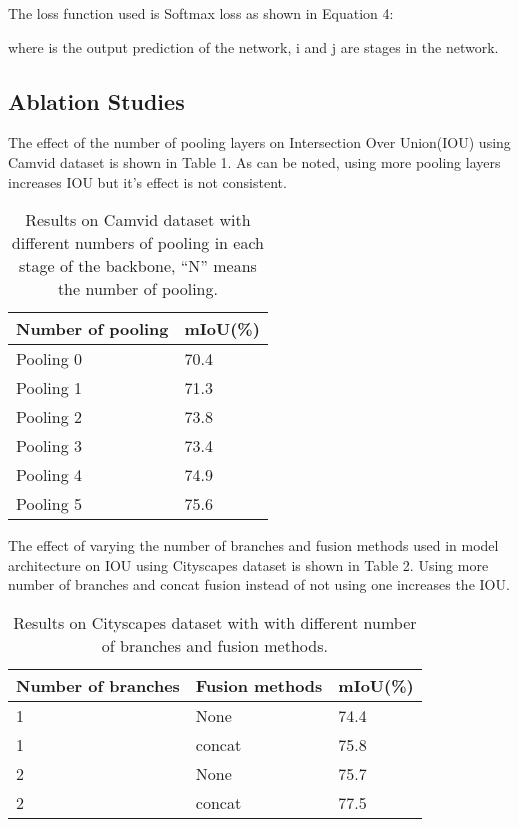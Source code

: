\documentclass{article}
\begin{document}
The loss function used is Softmax loss as shown in Equation 4:



where  is the output prediction of the network, i and j are stages in the network.

\subsection{Ablation Studies}

The effect of the number of pooling layers on Intersection Over Union(IOU) using Camvid dataset is shown in Table 1. As can be noted, using more pooling layers increases IOU but it's effect is not consistent.

\begin{table}[h]
  \caption{Results on Camvid dataset with different numbers of pooling in each stage of the backbone, “N” means the number of pooling.}
  \label{sample-table2}
  \centering
  \begin{tabular}{ll}
  \toprule
    Number of pooling &mIoU(\%)\\
   \midrule
 Pooling 0 &70.4\\
Pooling 1 &71.3\\
Pooling 2 &73.8\\
Pooling 3 &73.4\\
Pooling 4 &74.9\\
Pooling 5 &75.6\\
    \bottomrule
  \end{tabular}
\end{table}

The effect of varying the number of branches and fusion methods used in model architecture on IOU using Cityscapes dataset is shown in Table 2. Using more number of branches and concat fusion instead of not using one increases the IOU. 

\begin{table}[h]
  \caption{Results on Cityscapes dataset with with different number of branches and fusion methods.}
  \label{sample-table3}
  \centering
  \begin{tabular}{lll}
  \toprule
    Number of branches &Fusion methods &mIoU(\%)\\
   \midrule
1 &None &74.4\\
1 &concat &75.8\\
2 &None &75.7\\
2 &concat &77.5\\
    \bottomrule
  \end{tabular}
\end{table}
\end{document}
